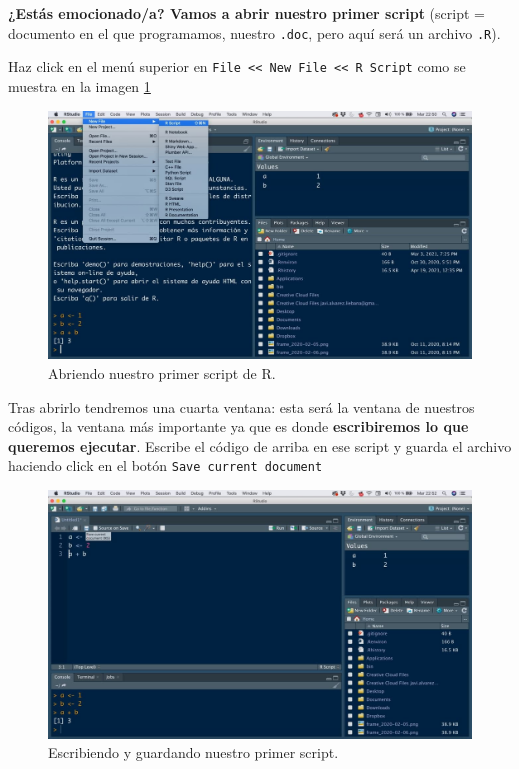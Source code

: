 \documentclass[11pt,]{book}
\begin{document}
\textbf{¿Estás emocionado/a? Vamos a abrir nuestro primer script} (script = documento en el que programamos, nuestro \texttt{.doc}, pero aquí será un archivo \texttt{.R}).

Haz click en el menú superior en \texttt{File\ \textless{}\textless{}\ New\ File\ \textless{}\textless{}\ R\ Script} como se muestra en la imagen \ref{fig:inicio-rstudio-5}

\begin{figure}

{\centering \includegraphics[width=0.75\linewidth]{./img/inicio_rstudio_5} 

}

\caption{Abriendo nuestro primer script de R.}\label{fig:inicio-rstudio-5}
\end{figure}

Tras abrirlo tendremos una cuarta ventana: esta será la ventana de nuestros códigos, la ventana más importante ya que es donde \textbf{escribiremos lo que queremos ejecutar}. Escribe el código de arriba en ese script y guarda el archivo haciendo click en el botón \texttt{Save\ current\ document}

\begin{figure}

{\centering \includegraphics[width=0.75\linewidth]{./img/inicio_rstudio_6} 

}

\caption{Escribiendo y guardando nuestro primer script.}\label{fig:inicio-rstudio-6}
\end{figure}
\end{document}

